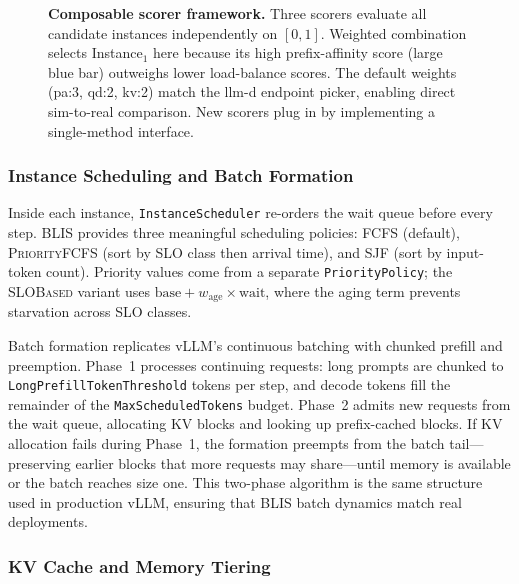 \documentclass[11pt]{article}
\theoremstyle{plain} %
\theoremstyle{definition} %
\theoremstyle{remark} %
\newcommand{\code}[1]{\texttt{#1}}
\numberwithin{equation}{section}
\begin{document}
\begin{figure}[t]
\caption{\textbf{Composable scorer framework.}
  Three scorers evaluate all candidate instances independently on $[0,1]$.
  Weighted combination selects Instance$_1$ here because its high prefix-affinity
  score (large blue bar) outweighs lower load-balance scores.
  The default weights (pa:3, qd:2, kv:2) match the llm-d endpoint picker,
  enabling direct sim-to-real comparison.
  New scorers plug in by implementing a single-method interface.}
\label{fig:scorer}
\end{figure}

\subsubsection{Instance Scheduling and Batch Formation}
\label{subsubsec:scheduling}

Inside each instance, \code{InstanceScheduler} re-orders the wait queue before
every step.
BLIS provides three meaningful scheduling policies: \textsc{FCFS} (default),
\textsc{PriorityFCFS} (sort by SLO class then arrival time), and
\textsc{SJF} (sort by input-token count).
Priority values come from a separate \code{PriorityPolicy}; the
\textsc{SLOBased} variant uses $\text{base} + w_\text{age} \times \text{wait}$,
where the aging term prevents starvation across SLO classes.

Batch formation replicates vLLM's continuous batching with chunked prefill and
preemption.
Phase~1 processes continuing requests: long prompts are chunked to
\code{LongPrefillTokenThreshold} tokens per step, and decode tokens fill the
remainder of the \code{MaxScheduledTokens} budget.
Phase~2 admits new requests from the wait queue, allocating KV blocks and
looking up prefix-cached blocks.
If KV allocation fails during Phase~1, the formation preempts from the batch
tail---preserving earlier blocks that more requests may share---until memory
is available or the batch reaches size one.
This two-phase algorithm is the same structure used in production vLLM, ensuring
that BLIS batch dynamics match real deployments.

\subsubsection{KV Cache and Memory Tiering}
\label{subsubsec:kvcache}
\end{document}
